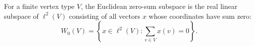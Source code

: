 \begin{definition}
For a finite vertex type \(V\), the Euclidean zero-sum subspace is the real
linear subspace of \(\ell^2(V)\) consisting of all vectors \(x\) whose
coordinates have sum zero:
\[
  W_0(V)=\left\{x\in \ell^2(V): \sum_{v\in V} x(v)=0\right\}.
\]
\end{definition}

